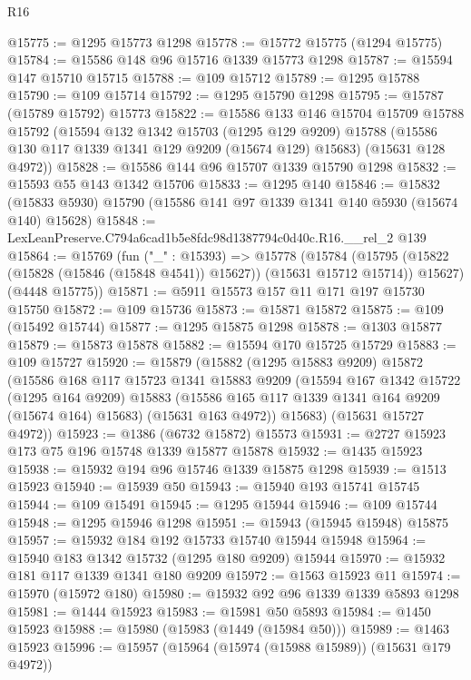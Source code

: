 \begin{lexlean}{R16}
\begin{coremodule}
@15775 := @1295 @15773 @1298
@15778 := @15772 @15775 (@1294 @15775)
@15784 := @15586 @148 @96 @15716 @1339 @15773 @1298
@15787 := @15594 @147 @15710 @15715
@15788 := @109 @15712
@15789 := @1295 @15788
@15790 := @109 @15714
@15792 := @1295 @15790 @1298
@15795 := @15787 (@15789 @15792) @15773
@15822 := @15586
    @133
    @146
    @15704
    @15709
    @15788
    @15792
    (@15594
      @132
      @1342
      @15703
      (@1295 @129 @9209)
      @15788
      (@15586 @130 @117 @1339 @1341 @129 @9209 (@15674 @129) @15683)
      (@15631 @128 @4972))
@15828 := @15586 @144 @96 @15707 @1339 @15790 @1298
@15832 := @15593 @55 @143 @1342 @15706
@15833 := @1295 @140
@15846 := @15832 (@15833 @5930) @15790 (@15586 @141 @97 @1339 @1341 @140 @5930 (@15674 @140) @15628)
@15848 := LexLeanPreserve.C794a6cad1b5e8fdc98d1387794c0d40c.R16.__rel_2 @139
@15864 := @15769
    (fun ("_" : @15393) =>
    @15778
      (@15784
        (@15795 (@15822 (@15828 (@15846 (@15848 @4541)) @15627)) (@15631 @15712 @15714))
        @15627)
      (@4448 @15775))
@15871 := @5911 @15573 @157 @11 @171 @197 @15730 @15750
@15872 := @109 @15736
@15873 := @15871 @15872
@15875 := @109 (@15492 @15744)
@15877 := @1295 @15875 @1298
@15878 := @1303 @15877
@15879 := @15873 @15878
@15882 := @15594 @170 @15725 @15729
@15883 := @109 @15727
@15920 := @15879
    (@15882
      (@1295 @15883 @9209)
      @15872
      (@15586
        @168
        @117
        @15723
        @1341
        @15883
        @9209
        (@15594
          @167
          @1342
          @15722
          (@1295 @164 @9209)
          @15883
          (@15586 @165 @117 @1339 @1341 @164 @9209 (@15674 @164) @15683)
          (@15631 @163 @4972))
        @15683)
      (@15631 @15727 @4972))
@15923 := @1386 (@6732 @15872) @15573
@15931 := @2727 @15923 @173 @75 @196 @15748 @1339 @15877 @15878
@15932 := @1435 @15923
@15938 := @15932 @194 @96 @15746 @1339 @15875 @1298
@15939 := @1513 @15923
@15940 := @15939 @50
@15943 := @15940 @193 @15741 @15745
@15944 := @109 @15491
@15945 := @1295 @15944
@15946 := @109 @15744
@15948 := @1295 @15946 @1298
@15951 := @15943 (@15945 @15948) @15875
@15957 := @15932 @184 @192 @15733 @15740 @15944 @15948
@15964 := @15940 @183 @1342 @15732 (@1295 @180 @9209) @15944
@15970 := @15932 @181 @117 @1339 @1341 @180 @9209
@15972 := @1563 @15923 @11
@15974 := @15970 (@15972 @180)
@15980 := @15932 @92 @96 @1339 @1339 @5893 @1298
@15981 := @1444 @15923
@15983 := @15981 @50 @5893
@15984 := @1450 @15923
@15988 := @15980 (@15983 (@1449 (@15984 @50)))
@15989 := @1463 @15923
@15996 := @15957 (@15964 (@15974 (@15988 @15989)) (@15631 @179 @4972))

\end{coremodule}
\end{lexlean}
